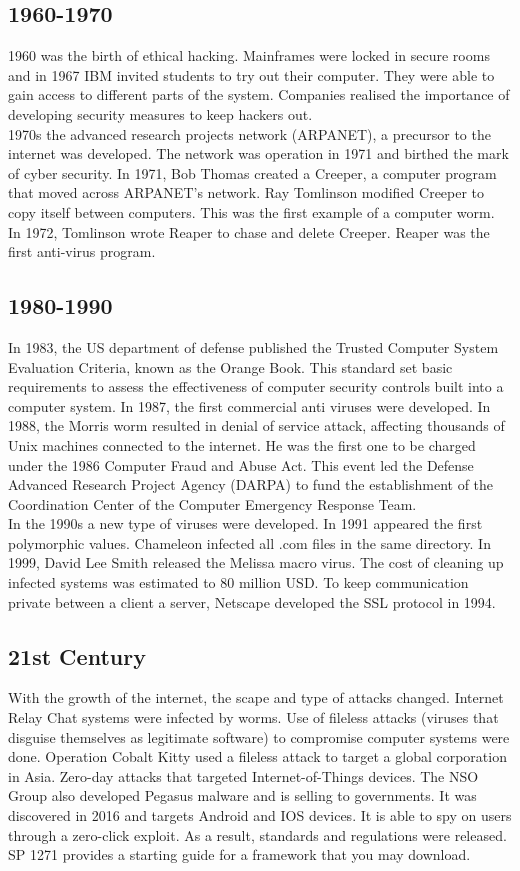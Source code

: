 \documentclass[a4paper]{article}
\theoremstyle{plain}
\theoremstyle{definition}
\theoremstyle{remark}
\begin{document}
	\subsection{1960-1970}
	1960 was the birth of ethical hacking. Mainframes were locked in secure rooms and in 1967 IBM invited students to try out their computer. They were able to gain access to different parts of the system. Companies realised the importance of developing security measures to keep hackers out. \\
	1970s the advanced research projects network (ARPANET), a precursor to the internet was developed. The network was operation in 1971 and birthed the mark of cyber security. In 1971, Bob Thomas created a Creeper, a computer program that moved across ARPANET's network. Ray Tomlinson modified Creeper to copy itself between computers. This was the first example of a computer worm. In 1972, Tomlinson wrote Reaper to chase and delete Creeper. Reaper was the first anti-virus program.
	\subsection{1980-1990}
	In 1983, the US department of defense published the Trusted Computer System Evaluation Criteria, known as the Orange Book. This standard set basic requirements to assess the effectiveness of computer security controls built into a computer system. In 1987, the first commercial anti viruses were developed. In 1988, the Morris worm resulted in denial of service attack, affecting thousands of Unix machines connected to the internet. He was the first one to be charged under the 1986 Computer Fraud and Abuse Act. This event led the Defense Advanced Research Project Agency (DARPA) to fund the establishment of the Coordination Center of the Computer Emergency Response Team. \\
	In the 1990s a new type of viruses were developed. In 1991 appeared the first polymorphic values. Chameleon infected all .com files in the same directory. In 1999, David Lee Smith released the Melissa macro virus. The cost of cleaning up infected systems was estimated to 80 million USD. To keep communication private between a client a server, Netscape developed the SSL protocol in 1994. 
	\subsection{21st Century}
	With the growth of the internet, the scape and type of attacks changed. Internet Relay Chat systems were infected by worms. Use of fileless attacks (viruses that disguise themselves as legitimate software) to compromise computer systems were done. Operation Cobalt Kitty used a fileless attack to target a global corporation in Asia. Zero-day attacks that targeted Internet-of-Things devices. The NSO Group also developed Pegasus malware and is selling to governments. It was discovered in 2016 and targets Android and IOS devices. It is able to spy on users through a zero-click exploit. As a result, standards and regulations were released. SP 1271 provides a starting guide for a framework that you may download.
\end{document}
